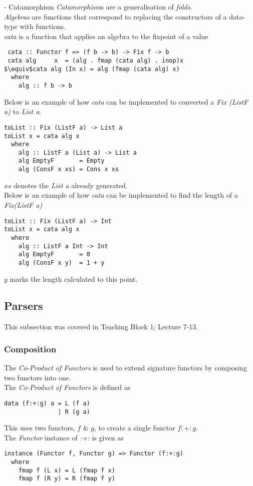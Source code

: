 \documentclass[11pt,a4paper]{article}
\begin{document}
\begin{definition}{{} - Catamorphism}
\textit{Catamorphism}s are a generalisation of \textit{folds}.\\
\textit{Algebras} are functions that correspond to replacing the constructors of a data-type with functions.\\
\textit{cata} is a function that applies an algebra to the fixpoint of a value
\begin{lstlisting}
 cata :: Functor f => (f b -> b) -> Fix f -> b
 cata alg     x  = (alg . fmap (cata alg) . inop)x
$\equiv$cata alg (In x) = alg (fmap (cata alg) x)
  where
    alg :: f b -> b
\end{lstlisting}
\end{definition}

\begin{example}{{}}
Below is an example of how \textit{cata} can be implemented to converted a \textit{Fix (ListF a)} to \textit{List a}.
\begin{lstlisting}
toList :: Fix (ListF a) -> List a
toList x = cata alg x
  where
    alg :: ListF a (List a) -> List a
    alg EmptyF       = Empty
    alg (ConsF x xs) = Cons x xs
\end{lstlisting}
\NB $xs$ denotes the \textit{List a} already generated.\\
Below is an example of how \textit{cata} can be implemented to find the length of a \textit{Fix(ListF a)}
\begin{lstlisting}
toList :: Fix (ListF a) -> Int
toList x = cata alg x
  where
    alg :: ListF a Int -> Int
    alg EmptyF       = 0
    alg (ConsF x y)  = 1 + y
\end{lstlisting}
\NB $y$ marks the length calculated to this point.\\
\end{example}

\subsection{Parsers}
This subsection was covered in Teaching Block 1; Lecture 7-13.

\subsubsection{Composition}

The \textit{Co-Product of Functors} is used to extend signature functors by composing two functors into one.\\
The \textit{Co-Product of Functors} is defined as
\begin{lstlisting}
data (f:+:g) a = L (f a)
               | R (g a)
\end{lstlisting}
This uses two functors, $f$ \& $g$, to create a single functor $f:+:g$.\\
The \textit{Functor} instance of \textit{:+:} is given as
\begin{lstlisting}
instance (Functor f, Functor g) => Functor (f:+:g)
  where
    fmap f (L x) = L (fmap f x)
    fmap f (R y) = R (fmap f y)
\end{lstlisting}
\end{document}
